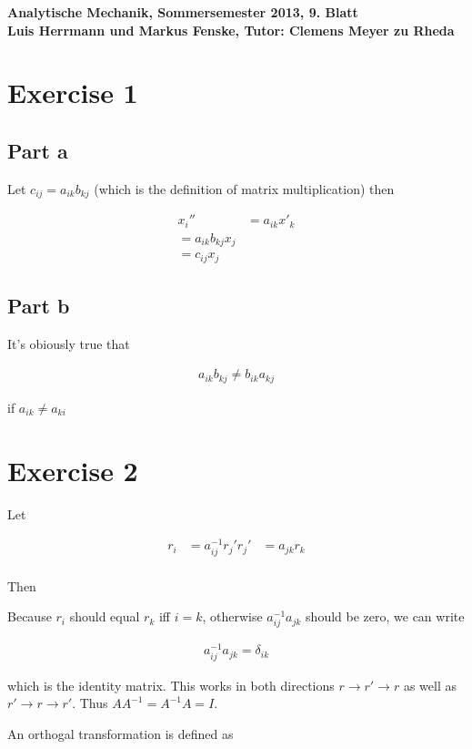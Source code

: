 \documentclass[a4paper,german,12pt,smallheadings]{scrartcl}
\begin{document}
\begin{center}
\bfseries %
\sffamily %
\vspace{-40pt}
Analytische Mechanik, Sommersemester 2013, 9. Blatt \\
Luis Herrmann und Markus Fenske, Tutor: Clemens Meyer zu Rheda
\vspace{-10pt}
\end{center}
\section*{Exercise 1}
\subsection*{Part a}

Let $c_{ij} = a_{ik} b_{kj}$ (which is the definition of matrix multiplication)
then

\begin{align*}
  x_i'' &= a_{ik} x'_k \\
         = a_{ik} b_{kj} x_j \\
         = c_{ij} x_j
\end{align*}

\subsection*{Part b}

It's obiously true that

\begin{align*}
  a_{ik} b_{kj} \neq b_{ik} a_{kj}
\end{align*}

if $a_{ik} \neq a_{ki}$


\section*{Exercise 2}

Let

\begin{align*}
  r_i  &= a^{-1}_{ij} r_j'
  r_j' &= a_{jk} r_k \\
\end{align*}

Then


Because $r_i$ should equal $r_k$ iff $i = k$, otherwise $a^{-1}_{ij} a_{jk}$
should be zero, we can write

\begin{align*}
  a^{-1}_{ij} a_{jk} = \delta_{ik}
\end{align*}

which is the identity matrix. This works in both directions $r \to r' \to r$ as
well as $r' \to r \to r'$. Thus $AA^{-1} = A^{-1}A = I$.

An orthogal transformation is defined as 
\end{document}
